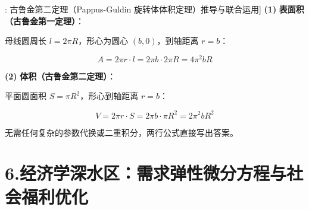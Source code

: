 \documentclass[11pt,a4paper,UTF8]{ctexart}
\begin{document}
\begin{thmbox}[定理[2]: 古鲁金第二定理（Pappus-Guldin 旋转体体积定理）推导与联合运用]
\textbf{(1)}  \textbf{表面积（古鲁金第一定理）}：

母线圆周长 $l = 2\pi R$，形心为圆心 $(b, 0)$，到轴距离 $r = b$：


\begin{equation*}
A = 2\pi r \cdot l = 2\pi b \cdot 2\pi R = 4\pi^2 b R
\end{equation*}


\textbf{(2)}  \textbf{体积（古鲁金第二定理）}：

平面圆面积 $S = \pi R^2$，形心到轴距离 $r = b$：


\begin{equation*}
V = 2\pi r \cdot S = 2\pi b \cdot \pi R^2 = 2\pi^2 b R^2
\end{equation*}


无需任何复杂的参数代换或二重积分，两行公式直接写出答案。

\end{thmbox}

\section{6.经济学深水区：需求弹性微分方程与社会福利优化}
\end{document}

